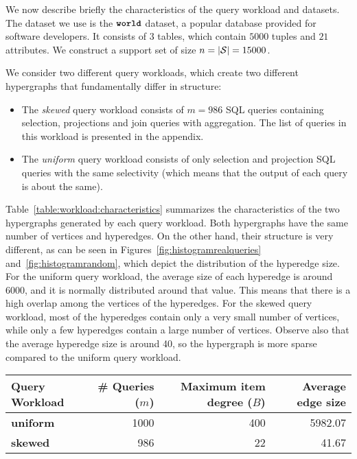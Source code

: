 We now describe briefly the characteristics of the query workload and datasets. The dataset we use is the $\texttt{\bfseries world}$ dataset, a popular database provided for software developers. 
It consists of $3$ tables, which contain $5000$ tuples and $21$ attributes. We construct a support set of size $n = |\mathcal{S}| = 15000$.

We consider two different query workloads, which create two different hypergraphs that fundamentally differ in structure:
%
\begin{itemize}
\item The {\em skewed} query workload consists of $m = 986$ SQL queries containing selection, projections and join queries with aggregation. The list of queries in this workload is presented in the appendix. 
%
\item The {\em uniform} query workload consists of only selection and projection SQL queries with the same selectivity (which means that the output of each query is about the same). 
\end{itemize}



Table~\ref{table:workload:characteristics} summarizes the characteristics of the two hypergraphs
generated by each query workload. Both hypergraphs have the same number of vertices and
hyperedges. On the other hand, their structure is very different, as can be seen in 
Figures~\ref{fig:histogramrealqueries} and~\ref{fig:histogramrandom}, which depict the distribution of the hyperedge size. For the uniform query workload, the average size of each hyperedge is around 6000, and it is normally distributed around that value. This means that there is a high overlap among the vertices of the hyperedges. For the skewed query workload, most of the hyperedges contain only a very small number of vertices, while only a few hyperedges contain a large number of vertices. Observe also that the average hyperedge size is around 40, so the hypergraph is more sparse
compared to the uniform query workload.

\begin{table*}[h] \centering
	\begin{small}
		\begin{tabular}{@{}lrrr@{}}\toprule
			\textbf{Query Workload} & \textbf{\# Queries ($m$)} & \textbf{Maximum item degree ($B$)} & \textbf{Average edge size} \\ \midrule
			\textbf{uniform} &  1000 & 400 & 5982.07   \\ \hdashline
			\textbf{skewed} &  986 & 22 & 41.67    \\ 
			
			\bottomrule
		\end{tabular}
	\end{small}
	\caption{Hypergraph Characteristics}
	\label{table:workload:characteristics}
\end{table*}

